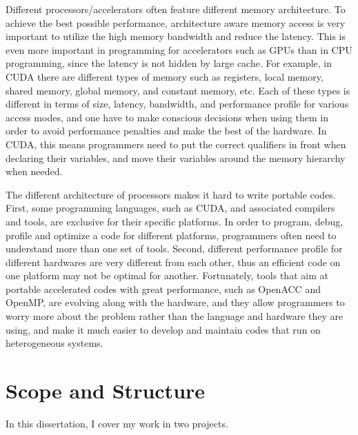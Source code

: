 Different processors/accelerators often feature different memory architecture.
To achieve the best possible performance, architecture aware memory access is 
very important to utilize the high memory bandwidth and reduce the latency.
This is even more important in programming for accelerators such as GPUs than in
CPU programming, since the latency is not hidden by large cache.
For example, in CUDA %
there are different types of memory such as registers, local memory, shared 
memory, global memory, and constant memory, etc. Each of these types is 
different in terms of size, latency, bandwidth, and performance profile for 
various access modes, and one have to make conscious decisions when using them
in order to avoid performance penalties and make the best of the hardware. 
In CUDA, this means programmers need to put the correct qualifiers in front when 
declaring their variables, and move their variables around the memory hierarchy 
when needed.
 

The different architecture of processors makes it hard to write portable codes.
First, some programming languages, such as CUDA, and associated compilers and tools,
 are exclusive for their specific platforms. In order to program, debug, profile 
and optimize a code for different platforms, programmers often need to understand 
more than one set of tools. 
Second, different performance profile for different hardwares are very
different from each other, thus an efficient code on one platform may not be
optimal for another. 
Fortunately, tools that aim at portable accelerated codes with great performance, such as 
OpenACC and OpenMP, are evolving along with the hardware, and they allow programmers
to worry more about the problem rather than the language and hardware they are
using, and make it much easier to develop and maintain codes that run on heterogeneous systems.





\section{Scope and Structure}
In this dissertation, I cover my work in two projects.

